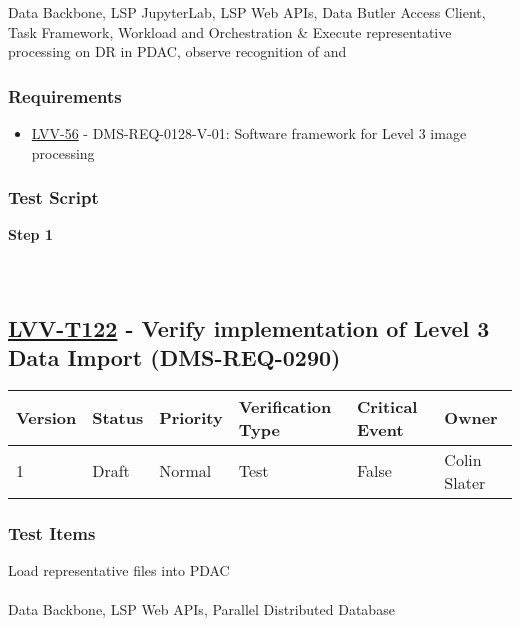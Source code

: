 Data Backbone, LSP JupyterLab, LSP Web APIs, Data Butler Access Client,
Task Framework, Workload and Orchestration \& Execute representative
processing on DR in PDAC, observe recognition of and

\hypertarget{requirements-98}{%
\subsubsection{Requirements}\label{requirements-98}}

\begin{itemize}
\tightlist
\item
  \href{https://jira.lsstcorp.org/browse/LVV-56}{LVV-56} -
  DMS-REQ-0128-V-01: Software framework for Level 3 image processing
\end{itemize}

\hypertarget{test-script-98}{%
\subsubsection{Test Script}\label{test-script-98}}

\textbf{Step 1}\\
~\\
~\\

\hypertarget{lvv-t122---verify-implementation-of-level-3-data-import-dms-req-0290}{%
\subsection{\texorpdfstring{\href{https://jira.lsstcorp.org/secure/Tests.jspa\#/testCase/LVV-T122}{LVV-T122}
- Verify implementation of Level 3 Data Import
(DMS-REQ-0290)}{LVV-T122 - Verify implementation of Level 3 Data Import (DMS-REQ-0290)}}\label{lvv-t122---verify-implementation-of-level-3-data-import-dms-req-0290}}

\begin{longtable}[]{@{}llllll@{}}
\toprule
Version & Status & Priority & Verification Type & Critical Event &
Owner\tabularnewline
\midrule
\endhead
1 & Draft & Normal & Test & False & Colin Slater\tabularnewline
\bottomrule
\end{longtable}

\hypertarget{test-items-98}{%
\subsubsection{Test Items}\label{test-items-98}}

Load representative files into PDAC\\
~\\
Data Backbone, LSP Web APIs, Parallel Distributed Database

